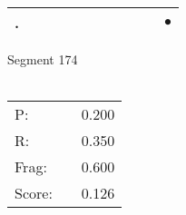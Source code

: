 \documentclass[landscape]{article}
\newcommand{\ssp}{\hspace{2pt}}
\newcommand{\mex}{\cellcolor{g}$\bullet$}
\begin{document}
\begin{tabular}{|l|p{10pt}|p{10pt}|p{10pt}|p{10pt}|p{10pt}|p{10pt}|p{10pt}|p{10pt}|p{10pt}|p{10pt}|}
\hline
\ssp \cellcolor{ref9}. \ssp&\hspace{2pt}&\hspace{2pt}&\hspace{2pt}&\hspace{2pt}&\hspace{2pt}&\hspace{2pt}&\hspace{2pt}&\hspace{2pt}&\hspace{2pt}&\hspace{2pt}\mex\\
\hline
\end{tabular}

\vspace{6pt}
\noindent Segment 174\\\\
\noindent\begin{tabular}{lm{12pt}r}
\hline
P:&&0.200\\
R:&&0.350\\
Frag:&&0.600\\
Score:&&0.126\\
\end{tabular}

\newpage
\end{document}
